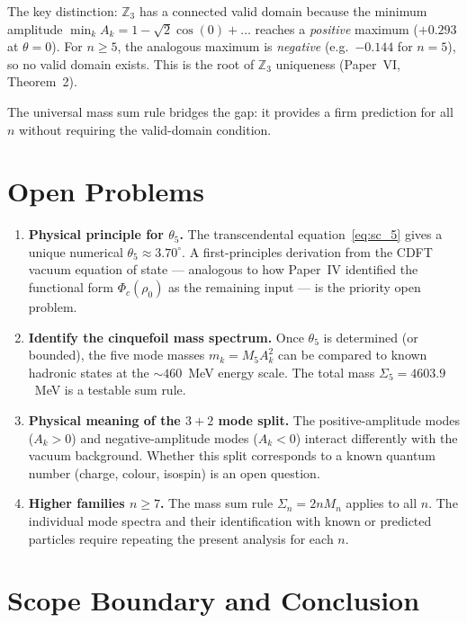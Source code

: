 \documentclass[11pt]{article}
\begin{document}
The key distinction: $\mathbb{Z}_3$ has a connected valid domain because
the minimum amplitude $\min_k A_k = 1 - \sqrt{2}\cos(0) + \ldots$
reaches a \emph{positive} maximum ($+0.293$ at $\theta = 0$).
For $n \geq 5$, the analogous maximum is \emph{negative}
(e.g.\ $-0.144$ for $n = 5$), so no valid domain exists.
This is the root of $\mathbb{Z}_3$ uniqueness (Paper~VI, Theorem~2).

The universal mass sum rule bridges the gap: it provides a firm prediction
for all $n$ without requiring the valid-domain condition.


\section{Open Problems}
\label{sec:open}

\begin{enumerate}

\item \textbf{Physical principle for $\theta_5$.}
  The transcendental equation~\eqref{eq:sc_5} gives a unique numerical
  $\theta_5 \approx 3.70^\circ$.
  A first-principles derivation from the CDFT vacuum equation of state ---
  analogous to how Paper~IV identified the functional form $\Phi_c(\rho_0)$
  as the remaining input --- is the priority open problem.

\item \textbf{Identify the cinquefoil mass spectrum.}
  Once $\theta_5$ is determined (or bounded), the five mode masses
  $m_k = M_5 A_k^2$ can be compared to known hadronic states
  at the $\sim 460$~MeV energy scale.
  The total mass $\Sigma_5 = 4603.9$~MeV is a testable sum rule.

\item \textbf{Physical meaning of the $3 + 2$ mode split.}
  The positive-amplitude modes ($A_k > 0$) and negative-amplitude modes
  ($A_k < 0$) interact differently with the vacuum background.
  Whether this split corresponds to a known quantum number
  (charge, colour, isospin) is an open question.

\item \textbf{Higher families $n \geq 7$.}
  The mass sum rule $\Sigma_n = 2nM_n$ applies to all $n$.
  The individual mode spectra and their identification with known or
  predicted particles require repeating the present analysis for each $n$.

\end{enumerate}


\section{Scope Boundary and Conclusion}
\end{document}
